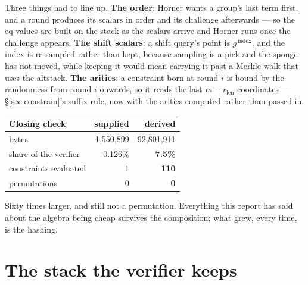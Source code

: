 \documentclass[11pt,a4paper]{article}
\newcommand{\eqp}{\mathrm{eq}}
\begin{document}
Three things had to line up. \textbf{The order}: Horner wants a group's last term first, and a round
produces its scalars in order and its challenge afterwards --- so the $\eqp$ values are built on the
stack as the scalars arrive and Horner runs once the challenge appears. \textbf{The shift scalars}:
a shift query's point is $g^{\,\text{index}}$, and the index is re-sampled rather than kept, because
sampling is a pick and the sponge has not moved, while keeping it would mean carrying it past a
Merkle walk that uses the altstack. \textbf{The arities}: a constraint born at round $i$ is bound by
the randomness from round $i$ onwards, so it reads the last $m-r_{\text{len}}$ coordinates ---
\S\ref{sec:constrain}'s suffix rule, now with the arities computed rather than passed in.

\begin{center}\small
\begin{tabular}{@{}lrr@{}}
\toprule
\textbf{Closing check} & \textbf{supplied} & \textbf{derived}\\
\midrule
bytes & 1{,}550{,}899 & 92{,}801{,}911\\
share of the verifier & 0.126\% & \textbf{7.5\%}\\
constraints evaluated & 1 & \textbf{110}\\
permutations & 0 & \textbf{0}\\
\bottomrule
\end{tabular}
\end{center}

Sixty times larger, and still not a permutation. Everything this report has said about the algebra
being cheap survives the composition; what grew, every time, is the hashing.

\medskip
\noindent{}

\section{The stack the verifier keeps}\label{sec:stack}
\end{document}
